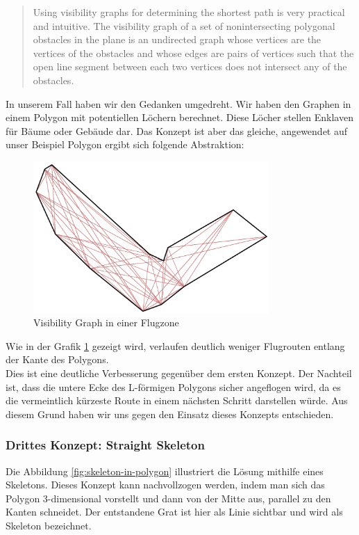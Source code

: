 \blockquote{Using visibility graphs for determining the shortest path is very practical and intuitive. The visibility graph of a set of nonintersecting polygonal obstacles in the plane is an undirected graph whose vertices are the vertices of the obstacles and whose edges are pairs of vertices such that the open line segment between each two vertices does not intersect any of the obstacles.}
In unserem Fall haben wir den Gedanken umgedreht. Wir haben den Graphen in einem Polygon mit potentiellen Löchern berechnet. Diese Löcher stellen Enklaven für Bäume oder Gebäude dar. Das Konzept ist aber das gleiche, angewendet auf unser Beispiel Polygon ergibt sich folgende Abstraktion:
\begin{figure}[h]
	\centering
	\includegraphics[width=0.8\textwidth]{images/routing/visibilityGraph.png}
	\caption{Visibility Graph in einer Flugzone}
	\label{fig:visibility-graph}
\end{figure}
Wie in der Grafik \ref{fig:visibility-graph} gezeigt wird, verlaufen deutlich weniger Flugrouten entlang der Kante des Polygons. \\
Dies ist eine deutliche Verbesserung gegenüber dem ersten Konzept. Der Nachteil ist, dass die untere Ecke des L-förmigen Polygons sicher angeflogen wird, da es die vermeintlich kürzeste Route in einem nächsten Schritt darstellen würde. Aus diesem Grund haben wir uns gegen den Einsatz dieses Konzepts entschieden.\\

\subsubsection{Drittes Konzept: Straight Skeleton}
Die Abbildung \ref{fig:skeleton-in-polygon} illustriert die Lösung mithilfe eines Skeletons. Dieses Konzept kann nachvollzogen werden, indem man sich das Polygon 3-dimensional vorstellt und dann  von der Mitte aus, parallel zu den Kanten schneidet. Der entstandene Grat ist hier als Linie sichtbar und wird als Skeleton bezeichnet.

